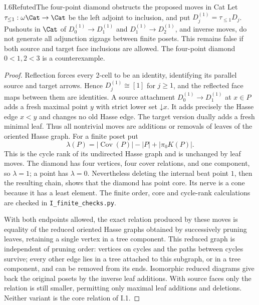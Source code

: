 \begin{claim}{I.6}{Refuted}{The four-point diamond obstructs the proposed moves in Cat}
Let $\tau_{\leq1}:\omega\Cat\to\Cat$ be the left adjoint to inclusion,
and put $D_j^{(1)}=\tau_{\leq1}D_j$. Pushouts in $\Cat$ of
$D_0^{(1)}\to D_1^{(1)}$ and $D_1^{(1)}\to D_2^{(1)}$, and inverse
moves, do not generate all adjunction zigzags between finite posets.
This remains false if both source and target face inclusions are
allowed. The four-point diamond $0<1,2<3$ is a counterexample.
\end{claim}
\begin{proof}
Reflection forces every 2-cell to be an identity, identifying its
parallel source and target arrows. Hence $D_j^{(1)}\cong[1]$ for
$j\geq1$, and the reflected face maps between them are identities.
A source attachment $D_0^{(1)}\to D_1^{(1)}$ at $x\in P$ adds a
fresh maximal point $y$ with strict lower set $\mathord\downarrow x$.
It adds precisely the Hasse edge $x<y$ and changes no old Hasse edge.
The target version dually adds a fresh minimal leaf. Thus all
nontrivial moves are additions or removals of leaves of the oriented
Hasse graph. For a finite poset put
\[
 \lambda(P)=|\operatorname{Cov}(P)|-|P|+|\pi_0K(P)|.
\]
This is the cycle rank of its undirected Hasse graph and is unchanged
by leaf moves. The diamond has four vertices, four cover relations,
and one component, so $\lambda=1$; a point has $\lambda=0$.
Nevertheless deleting the internal beat point $1$, then the resulting
chain, shows that the diamond has point core. Its nerve is a cone
because it has a least element. The finite order, core and cycle-rank
calculations are checked in \texttt{I\_finite\_checks.py}.

With both endpoints allowed, the exact relation produced by these
moves is equality of the reduced oriented Hasse graphs obtained by
successively pruning leaves, retaining a single vertex in a tree
component. This reduced graph is independent of pruning order:
vertices on cycles and the paths between cycles survive; every other
edge lies in a tree attached to this subgraph, or in a tree component,
and can be removed from its ends. Isomorphic reduced diagrams give
back the original posets by the inverse leaf additions. With source
faces only the relation is still smaller, permitting only maximal
leaf additions and deletions. Neither variant is the core relation
of I.1.
\end{proof}

